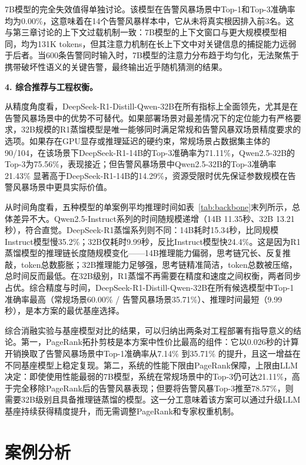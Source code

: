 7B模型的完全失效值得单独讨论。该模型在告警风暴场景中Top-1和Top-3准确率均为0.00\%，这意味着在14个告警风暴样本中，它从未将真实根因排入前3名。这与第三章讨论的上下文过载机制一致：7B模型的上下文窗口与更大规模模型相同，均为131K tokens，但其注意力机制在长上下文中对关键信息的捕捉能力远弱于后者。当600条告警同时输入时，7B模型的注意力分布趋于均匀化，无法聚焦于携带破坏性语义的关键告警，最终输出近乎随机猜测的结果。

\textbf{4. 综合推荐与工程权衡。}

从精度角度看，DeepSeek-R1-Distill-Qwen-32B在所有指标上全面领先，尤其是在告警风暴场景中的优势不可替代。如果部署场景对最差情况下的定位能力有严格要求，32B规模的R1蒸馏模型是唯一能够同时满足常规和告警风暴双场景精度要求的选项。如果存在GPU显存或推理延迟的硬约束，常规场景占数据集主体的90/104，在该场景下DeepSeek-R1-14B的Top-3准确率为71.11\%，Qwen2.5-32B的Top-3为75.56\%，表现接近；但告警风暴场景中Qwen2.5-32B的Top-3准确率21.43\% 显著高于DeepSeek-R1-14B的14.29\%，资源受限时优先保证参数规模在告警风暴场景中更具实际价值。

从时间角度看，五种模型的单案例平均推理时间如表~\ref{tab:backbone}末列所示，总体差异不大。Qwen2.5-Instruct系列的时间随规模递增（14B 11.35秒、32B 13.21秒），符合直觉。DeepSeek-R1蒸馏系列则不同：14B耗时15.34秒，比同规模Instruct模型慢35.2\%；32B仅耗时9.99秒，反比Instruct模型快24.4\%。这是因为R1蒸馏模型的推理链长度随规模变化——14B推理能力偏弱，思考链冗长、反复推敲，token总数膨胀；32B推理能力足够强，思考链精准简洁，token总数被压缩，总时间反而最低。在32B级别，R1蒸馏不再需要在精度和速度之间权衡，两者同步占优。综合精度与时间，DeepSeek-R1-Distill-Qwen-32B在所有候选模型中Top-1准确率最高（常规场景60.00\% / 告警风暴场景35.71\%）、推理时间最短（9.99秒），是本方案的最优基座选择。

综合消融实验与基座模型对比的结果，可以归纳出两条对工程部署有指导意义的结论。第一，PageRank拓扑剪枝是本方案中性价比最高的组件：它以0.026秒的计算开销换取了告警风暴场景中Top-1准确率从7.14\% 到35.71\% 的提升，且这一增益在不同基座模型上稳定复现。第二，系统的性能下限由PageRank保障，上限由LLM决定：即使使用性能最弱的7B模型，系统在常规场景中的Top-3仍可达21.11\%，高于完全移除PageRank后的告警风暴表现；但要将告警风暴Top-3推至78.57\%，则需要32B级别且具备推理链蒸馏的模型。这一分工意味着该方案可以通过升级LLM基座持续获得精度提升，而无需调整PageRank和专家权重机制。

\chapter{案例分析}

